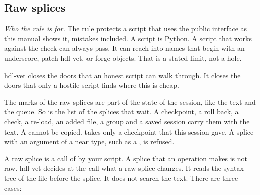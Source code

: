 \subsection*{Raw splices}
\label{sec:rawsplice}

\emph{Who the rule is for.} The rule protects a script that uses the public interface as
this manual shows it, mistakes included. A script is Python. A script that works against the
check can always pass. It can reach into names that begin with an underscore, patch
hdl-vet, or forge objects. That is a stated limit, not a hole.

hdl-vet closes the doors that an honest script can walk through. It closes the doors that
only a hostile script finds where this is cheap.

The marks of the raw splices are part of the state of the session, like the text and the
queue. So is the list of the splices that wait. A checkpoint, a roll back, a check, a re-load, an
added file, a group and a saved session carry them with the text. A  cannot be
copied.  takes only a checkpoint that this session gave. A splice
with an argument of a near type, such as a , is refused.

A raw splice is a call of  by your script. A splice that an operation
makes is not raw. hdl-vet decides at the call what a raw splice changes. It reads the syntax
tree of the file before the splice. It does not search the text. There are three cases:

